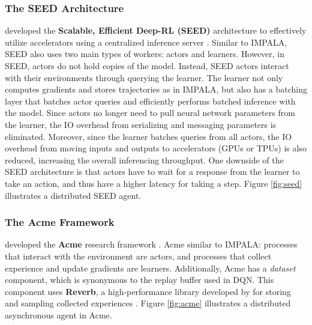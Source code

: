\subsubsection{The SEED Architecture}
\citeauthor{SEEDRLScalable_Espeholt.Marinier.ea_2020} developed the \textbf{Scalable, Efficient Deep-RL (SEED)} architecture to effectively utilize accelerators using a centralized inference server \cite{SEEDRLScalable_Espeholt.Marinier.ea_2020}.
Similar to IMPALA, SEED also uses two main types of workers: actors and learners.
However, in SEED, actors do not hold copies of the model.
Instead, SEED actors interact with their environments through querying the learner.
The learner not only computes gradients and stores trajectories as in IMPALA, but also has a batching layer that batches actor queries and efficiently performs batched inference with the model.
Since actors no longer need to pull neural network parameters from the learner, the IO overhead from serializing and messaging parameters is eliminated.
Moreover, since the learner batches queries from all actors, the IO overhead from moving inputs and outputs to accelerators (GPUs or TPUs) is also reduced, increasing the overall inferencing throughput.
One downside of the SEED architecture is that actors have to wait for a response from the learner to take an action, and thus have a higher latency for taking a step.
Figure \ref{fig:seed} illustrates a distributed SEED agent.

\subsubsection{The Acme Framework}
\citeauthor{AcmeResearchFramework_Hoffman.Shahriari.ea_2020} developed the \textbf{Acme} research framework \cite{AcmeResearchFramework_Hoffman.Shahriari.ea_2020}.
Acme similar to IMPALA:
processes that interact with the environment are actors,
and processes that collect experience and update gradients are learners.
Additionally, Acme has a \textit{dataset} component, which is synonymous to the replay buffer used in DQN.
This component uses \textbf{Reverb}, a high-performance library developed by \citeauthor{ReverbFrameworkExperience_Cassirer.Barth-Maron.ea_2021} for storing and sampling collected experiences \cite{ReverbFrameworkExperience_Cassirer.Barth-Maron.ea_2021}.
Figure \ref{fig:acme} illustrates a distributed asynchronous agent in Acme.

